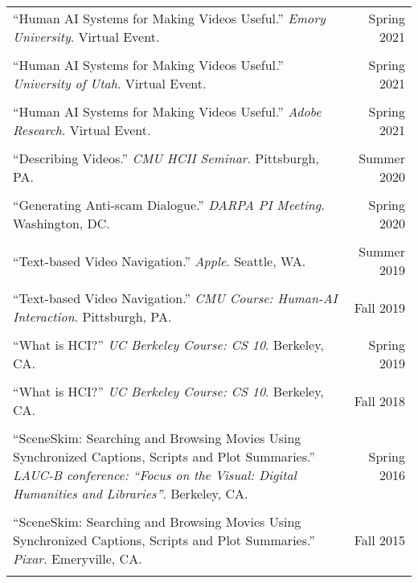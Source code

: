 \begin{longtable}{Xr}
	``Human AI Systems for Making Videos Useful.'' \textit{Emory University}. Virtual Event. & Spring 2021 \\
	\\

	``Human AI Systems for Making Videos Useful.'' \textit{University of Utah}. Virtual Event. & Spring 2021 \\
	\\

	``Human AI Systems for Making Videos Useful.'' \textit{Adobe Research}. Virtual Event. & Spring 2021 \\
	\\

	``Describing Videos.'' \textit{CMU HCII Seminar}. Pittsburgh, PA. & Summer 2020 \\
	\\

	``Generating Anti-scam Dialogue.'' \textit{DARPA PI Meeting}. Washington, DC. & Spring 2020 \\
	\\

	``Text-based Video Navigation.'' \textit{Apple}. Seattle, WA. & Summer 2019 \\
	\\

	``Text-based Video Navigation.'' \textit{CMU Course: Human-AI Interaction}. Pittsburgh, PA. & Fall 2019 \\
	\\

	``What is HCI?'' \textit{UC Berkeley Course: CS 10}. Berkeley, CA. & Spring 2019 \\
	\\

	``What is HCI?'' \textit{UC Berkeley Course: CS 10}. Berkeley, CA. & Fall 2018 \\
	\\

	``SceneSkim: Searching and Browsing Movies Using Synchronized Captions, Scripts and Plot Summaries.'' \textit{LAUC-B conference: ``Focus on the Visual: Digital Humanities and Libraries''}. Berkeley, CA. & Spring 2016 \\
	\\

	``SceneSkim: Searching and Browsing Movies Using Synchronized Captions, Scripts and Plot Summaries.'' \textit{Pixar}. Emeryville, CA. & Fall 2015 \\
	\\


\end{longtable}

